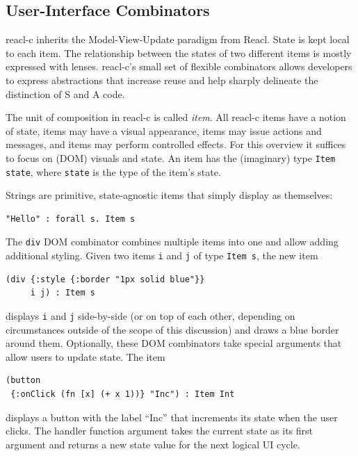 \documentclass[sigplan,screen]{acmart}
\begin{document}
\subsection{User-Interface Combinators}

reacl-c inherits the Model-View-Update paradigm from Reacl.  State is kept local to each item. The relationship between
the states of two different items is mostly expressed with lenses.  reacl-c's small
set of flexible combinators allows developers to express abstractions
that increase reuse and help sharply delineate the distinction of S
and A code.

The unit of
composition in reacl-c is called \textit{item}. All reacl-c items have
a notion of state, items may have a visual appearance, items may issue
actions and messages, and items may perform controlled effects.  For
this overview it suffices to focus on (DOM) visuals and state.
An item has the (imaginary) type \texttt{Item
  state}, where \texttt{state} is the type of the item's state.

Strings are primitive, state-agnostic items that simply display as
themselves:
%
\begin{verbatim}
"Hello" : forall s. Item s
\end{verbatim}
%
The \texttt{div} DOM combinator combines multiple items into
one and allow adding additional styling. Given two items \texttt{i}
and \texttt{j} of type \texttt{Item s}, the new item
%
\begin{verbatim}
(div {:style {:border "1px solid blue"}}
     i j) : Item s
\end{verbatim}
%
displays \texttt{i} and \texttt{j}
side-by-side (or on top of each other, depending on circumstances
outside of the scope of this discussion) and draws a blue
border around them. Optionally, these DOM combinators take special
arguments that allow users to update state. The item
%
\begin{verbatim}
(button
 {:onClick (fn [x] (+ x 1))} "Inc") : Item Int
\end{verbatim}
%
displays a button with the label ``Inc'' that increments its state
when the user clicks. The handler function argument takes the current state as its
first argument and returns a new state value for the next logical UI
cycle.
\end{document}
